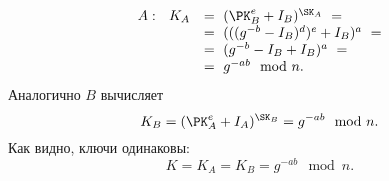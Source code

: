 \begin{enumerate}
        \[ \begin{array}{ll}
            A: ~~ K_A & = ~ (\PK_B^e + I_B)^{\SK_A} ~ = \\
                & = ~ (((g^{-b} - I_B)^d)^e + I_B)^a ~ = \\
                & = ~ (g^{-b} - I_B + I_B)^a ~ = \\
                & = ~ g^{-ab} \mod n. \\
        \end{array} \]
        Аналогично $B$ вычисляет
            \[ K_B = (\PK_A^e + I_A)^{\SK_B} = g^{-ab} \mod n. \]
        Как видно, ключи одинаковы:
            \[ K = K_A = K_B = g^{-ab} \mod n. \]
\end{enumerate}
